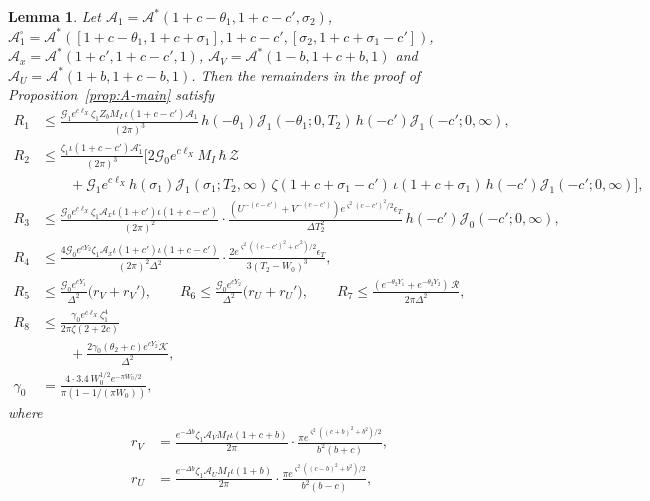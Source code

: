 \documentclass[11pt]{amsart}
\numberwithin{equation}{section}
\newtheorem{lemma}[theorem]{Lemma}
\theoremstyle{definition}
\theoremstyle{remark}
\begin{document}
\begin{lemma}\label{lem:A-rem}
Let $\mathcal A_1 = \mathcal A^*(1 + c - \theta_1, 1 + c - c', \sigma_2)$, $\mathcal A_1^\square = \mathcal A^*([1 + c - \theta_1, 1 + c + \sigma_1], 1 + c - c', [\sigma_2, 1 + c + \sigma_1 - c'])$, $\mathcal A_x = \mathcal A^*(1 + c', 1 + c - c', 1)$, $\mathcal A_V = \mathcal A^*(1 - b, 1 + c + b, 1)$ and $\mathcal A_U = \mathcal A^*(1 + b, 1 + c - b, 1)$.
Then the remainders in the proof of Proposition~\ref{prop:A-main} satisfy
\begin{align*}
R_1 &\leq \frac{\mathcal G_1e^{c\ell_X}\zeta_1Z_bM_I\,\iota(1 + c - c')\mathcal A_1}{(2\pi)^3}\,h(-\theta_1)\mathcal J_1(-\theta_1; 0, T_2)\,h(-c')\mathcal J_1(-c'; 0, \infty),\\
R_2 &\leq \frac{\zeta_1\iota(1 + c - c')\mathcal A_1^\square}{(2\pi)^3}\Big[2\mathcal G_0e^{c\ell_X}M_I\,\hbar\,\mathcal Z\\
&\qquad + \mathcal G_1e^{c\ell_X}h(\sigma_1)\mathcal J_1(\sigma_1; T_2, \infty)\,\zeta(1 + c + \sigma_1 - c')\,\iota(1 + c + \sigma_1)\,h(-c')\mathcal J_1(-c'; 0, \infty)\Big],\\
R_3 &\leq \frac{\mathcal G_0e^{c\ell_X}\zeta_1\mathcal A_x\iota(1 + c')\iota(1 + c - c')}{(2\pi)^2}\cdot\frac{(U^{-(c-c')} + V^{-(c-c')})e^{\varsigma^2(c-c')^2/2}\epsilon_T}{\Delta T_2^2}\,h(-c')\mathcal J_0(-c'; 0, \infty),\\
R_4 &\leq \frac{4\mathcal G_0e^{cY_2}\zeta_1\mathcal A_x\iota(1 + c')\iota(1 + c - c')}{(2\pi)^2\Delta^2}\cdot\frac{2e^{\varsigma^2((c-c')^2 + c'^2)/2}\epsilon_T}{3(T_2 - W_0)^3},\\
R_5 &\leq \frac{\mathcal G_0e^{cY_1}}{\Delta^2}\big(r_V + r_V'\big), \qquad
R_6 \leq \frac{\mathcal G_0e^{cY_2}}{\Delta^2}\big(r_U + r_U'\big), \qquad
R_7 \leq \frac{(e^{-\theta_2Y_1} + e^{-\theta_2Y_2})\,\mathcal R}{2\pi\Delta^2},\\
R_8 &\leq \frac{\gamma_0e^{c\ell_X}\zeta_1^4}{2\pi\zeta(2 + 2c)}\\
&\qquad + \frac{2\gamma_0(\theta_2 + c)e^{cY_2}\mathcal K}{\Delta^2},\\
\gamma_0 &= \frac{4\cdot3.4\,W_0^{1/2}e^{-\pi W_0/2}}{\pi(1 - 1/(\pi W_0))},
\end{align*}
where
\begin{align*}
r_V &= \frac{e^{-\Delta b}\zeta_1\mathcal A_VM_I\iota(1 + c + b)}{2\pi}\cdot\frac{\pi e^{\varsigma^2((c+b)^2 + b^2)/2}}{b^2(b + c)},\\
r_U &= \frac{e^{-\Delta b}\zeta_1\mathcal A_UM_I\iota(1 + b)}{2\pi}\cdot\frac{\pi e^{\varsigma^2((c-b)^2 + b^2)/2}}{b^2(b - c)},\\

\end{align*}
\end{lemma}
\end{document}

